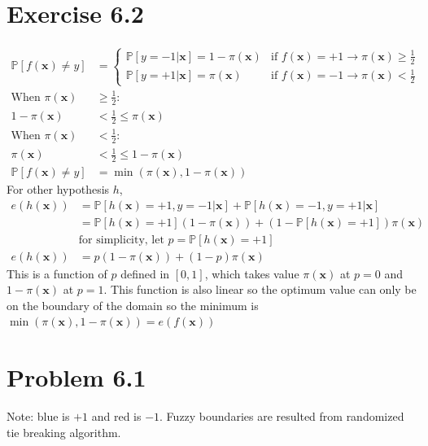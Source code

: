 \documentclass{article}
\begin{document}
	\section*{Exercise 6.2}
		\begin{align*}
			\mathbb P[f(\mathbf x) \neq y] &=
			\begin{cases}
				\mathbb P[y = -1 | \mathbf x] = 1 - \pi(\mathbf x)   &\text{if } f(\mathbf x) = +1 \rightarrow \pi(\mathbf x) \geq \frac12\\
				\mathbb P[y = +1 | \mathbf x] = \pi(\mathbf x) &\text{if } f(\mathbf x) = -1 \rightarrow \pi(\mathbf x) < \frac12
			\end{cases}\\
			\text{When } \pi(\mathbf x) &\geq \frac12:\\
			1 - \pi(\mathbf x) &< \frac12 \leq \pi(\mathbf x)\\
			\text{When } \pi(\mathbf x) &< \frac12:\\
			\pi(\mathbf x) &< \frac12 \leq 1 - \pi(\mathbf x)\\
			\mathbb P[f(\mathbf x) \neq y] &=\min(\pi(\mathbf x), 1 - \pi(\mathbf x))
		\end{align*}
		For other hypothesis $h$,
		\begin{align*}
			e(h(\mathbf x)) &= \mathbb P[h(\mathbf x) = +1, y = -1|\mathbf x] + \mathbb P[h(\mathbf x) = -1, y = +1|\mathbf x]\\
			&= \mathbb P[h(\mathbf x) = +1](1 - \pi(\mathbf x)) + (1 - \mathbb P[h(\mathbf x) = +1])\pi(\mathbf x)\\
			&\text{for simplicity, let } p = \mathbb P[h(\mathbf x) = +1]\\
			e(h(\mathbf x)) &= p(1 - \pi(\mathbf x)) + (1 - p)\pi(\mathbf x)
		\end{align*}
		This is a function of $p$ defined in $[0, 1]$, which takes value $\pi(\mathbf x)$ at $p = 0$ and $1-\pi(\mathbf x)$ at $p = 1$. This function is also linear so the optimum value can only be on the boundary of the domain so the minimum is $\min(\pi(\mathbf x), 1 - \pi(\mathbf x)) = e(f(\mathbf x))$
		
	\section*{Problem 6.1}
		Note: blue is $+1$ and red is $-1$. Fuzzy boundaries are resulted from randomized tie breaking algorithm.
\end{document}
